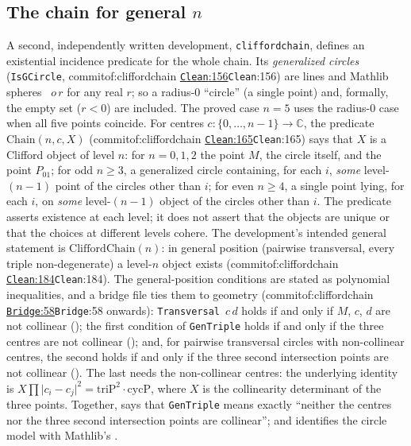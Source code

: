 \documentclass[11pt]{article}
\theoremstyle{definition}
\theoremstyle{remark}
\newcommand{\lean}[1]{\texttt{#1}}
\newcommand{\CC}{\mathbb{C}}
\newcommand{\commitof}[1]{\csname commitof:#1\endcsname}
\newcommand{\repo}[1]{https://github.com/jpbald93/#1}
\newcommand{\src}[4]{\ifcsname commitof:#1\endcsname
  \href{\repo{#1}/blob/\commitof{#1}/#2/#3.lean\#L#4}{\texttt{#3}:#4}\else\texttt{#3}:#4\fi}
\begin{document}
\subsection{The chain for general $n$}\label{sec:chain}
A second, independently written development, \lean{cliffordchain}, defines an existential incidence
predicate for the whole chain. Its \emph{generalized circles} (\lean{IsGCircle},
\src{cliffordchain}{Clifford}{Clean}{156}) are lines and Mathlib spheres ~$o\,r$ for
any real $r$; so a radius-$0$ ``circle'' (a single point) and, formally, the empty set ($r<0$) are
included. The proved case $n=5$ uses the radius-$0$ case when all five points coincide. For centres $c:\{0,\dots,n-1\}\to\CC$, the predicate
$\mathrm{Chain}(n,c,X)$ (\src{cliffordchain}{Clifford}{Clean}{165}) says that $X$ is a Clifford object of
level $n$: for $n=0,1,2$ the point $M$, the circle itself, and the point $P_{01}$; for odd $n\ge3$, a
generalized circle containing, for each $i$, \emph{some} level-$(n-1)$ point of the circles other than
$i$; for even $n\ge4$, a single point lying, for each $i$, on \emph{some} level-$(n-1)$ object of the
circles other than $i$. The predicate asserts existence at each level; it does not assert that the
objects are unique or that the choices at different levels cohere. The development's intended general statement is $\mathrm{CliffordChain}(n)$: in general
position (pairwise transversal, every triple non-degenerate) a level-$n$ object exists
(\src{cliffordchain}{Clifford}{Clean}{184}). The general-position conditions are stated as
polynomial inequalities, and a bridge file ties them to geometry (\src{cliffordchain}{Clifford}{Bridge}{58}
onwards): \lean{Transversal}~$c\,d$ holds if and only if $M$, $c$, $d$ are not collinear
(); the first condition of \lean{GenTriple} holds if and only if the three
centres are not collinear (); and, for pairwise transversal circles with
non-collinear centres, the second holds if and only if the three second intersection points are not
collinear (). The last needs the non-collinear centres: the underlying
identity is $X\prod\lvert c_i-c_j\rvert^2=\mathrm{triP}^2\cdot\mathrm{cycP}$, where $X$ is the collinearity
determinant of the three points. Together,  says that \lean{GenTriple} means
exactly ``neither the centres nor the three second intersection points are collinear''; and
 identifies the circle model with Mathlib's .
\end{document}

